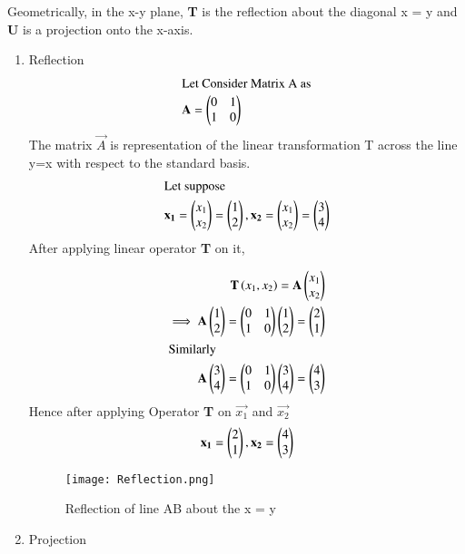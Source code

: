 \documentclass[journal,12pt,twocolumn]{IEEEtran}
\begin{document}
Geometrically, in the x-y plane, \textbf{T} is the reflection about the diagonal x = y and \textbf{U} is a projection onto the x-axis.\\ 
\begin{enumerate}
	\item Reflection
\begin{align}
\intertext{Let Consider Matrix A as} \mathbf{A} = \begin{pmatrix}0 & 1 \\ 1 & 0 \end{pmatrix} 
\end{align}
The matrix  $\vec{A}$ is representation  of the linear transformation T across the line y=x with respect to the standard basis.
\begin{align}
\intertext{Let suppose}\mathbf{x_1} =\begin{pmatrix}x_1 \\ x_2\end{pmatrix} = \begin{pmatrix}1 \\ 2\end{pmatrix},\mathbf{x_2} =\begin{pmatrix}x_1 \\ x_2\end{pmatrix} =\begin{pmatrix}3 \\ 4\end{pmatrix} 
\end{align}
After applying linear operator \textbf{T} on it,

\begin{align}
\textbf{T}\left(x_1, x_2\right) = \mathbf{A}\begin{pmatrix} x_1  \\ x_2\end{pmatrix}\\
\implies   \mathbf{A}\begin{pmatrix}1 \\ 2\end{pmatrix} =  \begin{pmatrix}0 & 1 \\ 1 & 0 \end{pmatrix} \begin{pmatrix}1 \\ 2\end{pmatrix} = \begin{pmatrix}2 \\ 1\end{pmatrix}\\
\intertext{Similarly}
  \mathbf{A}\begin{pmatrix}3 \\ 4\end{pmatrix} =  \begin{pmatrix}0 & 1 \\ 1 & 0 \end{pmatrix} \begin{pmatrix}3 \\ 4\end{pmatrix} = \begin{pmatrix}4 \\ 3\end{pmatrix}
  \end{align}
  Hence after  applying Operator \textbf{T} on $\vec{x_1}$ and $\vec{x_2}$
  \begin{align}
  \mathbf{x_1} = \begin{pmatrix}2\\1\end{pmatrix}, \mathbf{x_2} =\begin{pmatrix}4\\3\end{pmatrix}
\end{align}
\begin{figure}[htb!]	
	\centering	
	\texttt{[image: Reflection.png]}	
	\caption{Reflection of line AB about the  x = y}
	\label{fig1}	
\end{figure}
\item Projection
\end{enumerate}
\end{document}
